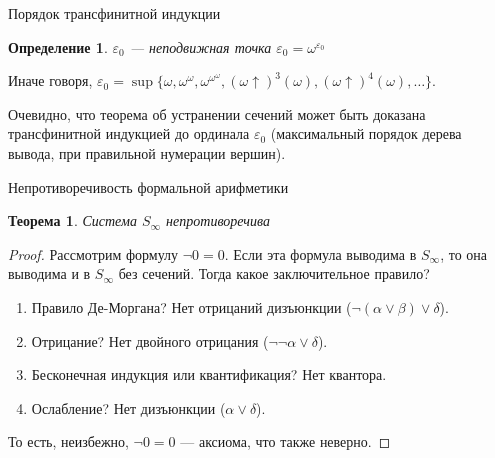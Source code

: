 \documentclass[aspectratio=169]{beamer}
\newtheorem{thm}{Теорема}[section]
\newtheorem{dfn}{Определение}[section]
\begin{document}
\begin{frame}{Порядок трансфинитной индукции}
\begin{dfn}$\varepsilon_0$ --- неподвижная точка $\varepsilon_0 = \omega^{\varepsilon_0}$\end{dfn}

Иначе говоря, $\varepsilon_0 = \sup \{ \omega, \omega^\omega, \omega^{\omega^\omega}, (\omega \uparrow)^3(\omega), (\omega\uparrow)^4(\omega), \dots \}$.

Очевидно, что теорема об устранении сечений может быть доказана трансфинитной индукцией до ординала $\varepsilon_0$
(максимальный порядок дерева вывода, при правильной нумерации вершин).
\end{frame}

\begin{frame}{Непротиворечивость формальной арифметики}
\begin{thm}Система $S_\infty$ непротиворечива\end{thm}
\begin{proof} \pause
Рассмотрим формулу $\neg 0=0$. 
Если эта формула выводима в $S_\infty$, то она выводима и в $S_\infty$ без сечений.
Тогда какое заключительное правило? \pause
\begin{enumerate}
\item Правило Де-Моргана? \pause Нет отрицаний дизъюнкции ($\neg(\alpha\vee\beta)\vee\delta$). \pause
\item Отрицание? \pause Нет двойного отрицания ($\neg\neg\alpha\vee\delta$). \pause
\item Бесконечная индукция или квантификация? \pause Нет квантора. \pause
\item Ослабление? \pause Нет дизъюнкции ($\alpha \vee \delta$). \pause
\end{enumerate}

То есть, неизбежно, $\neg 0=0$ --- аксиома, что также неверно.
\end{proof}
\end{frame}
\end{document}
